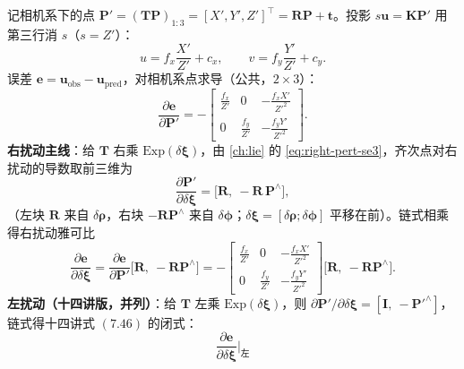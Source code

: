 \begin{derivation}
\label{thm:vo-reproj-jac}
记相机系下的点 $\mathbf{P}'=(\mathbf{T}\mathbf{P})_{1:3}=[X',Y',Z']^\top=\mathbf{R}\mathbf{P}+\mathbf{t}$\cite{gaoxiang2019slam14}。投影 $s\mathbf{u}=\mathbf{K}\mathbf{P}'$ 用第三行消 $s$（$s=Z'$）：
\begin{equation}
  u=f_x\frac{X'}{Z'}+c_x,\qquad v=f_y\frac{Y'}{Z'}+c_y.
  \label{eq:vo-proj-uv}
\end{equation}
误差 $\mathbf{e}=\mathbf{u}_{\text{obs}}-\mathbf{u}_{\text{pred}}$，对相机系点求导（公共，$2\times3$）：
\begin{equation}
  \frac{\partial\mathbf{e}}{\partial\mathbf{P}'}=-\begin{bmatrix}\frac{f_x}{Z'}&0&-\frac{f_xX'}{Z'^2}\\[2pt]0&\frac{f_y}{Z'}&-\frac{f_yY'}{Z'^2}\end{bmatrix}.
  \label{eq:vo-de-dP}
\end{equation}
\textbf{右扰动主线}：给 $\mathbf{T}$ 右乘 $\mathrm{Exp}(\delta\boldsymbol{\xi})$，由 \cref{ch:lie} 的 \cref{eq:right-pert-se3}，齐次点对右扰动的导数取前三维为
\begin{equation}
  \frac{\partial\mathbf{P}'}{\partial\delta\boldsymbol{\xi}}=\big[\mathbf{R},\ -\mathbf{R}\,\mathbf{P}^\wedge\big],
  \label{eq:vo-dP-dxi-right}
\end{equation}
（左块 $\mathbf{R}$ 来自 $\delta\boldsymbol{\rho}$，右块 $-\mathbf{R}\mathbf{P}^\wedge$ 来自 $\delta\boldsymbol{\phi}$；$\delta\boldsymbol{\xi}=[\delta\boldsymbol{\rho};\delta\boldsymbol{\phi}]$ 平移在前）。链式相乘得右扰动雅可比
\begin{equation}
  \frac{\partial\mathbf{e}}{\partial\delta\boldsymbol{\xi}}
  =\frac{\partial\mathbf{e}}{\partial\mathbf{P}'}\big[\mathbf{R},\ -\mathbf{R}\mathbf{P}^\wedge\big]
  =-\begin{bmatrix}\frac{f_x}{Z'}&0&-\frac{f_xX'}{Z'^2}\\0&\frac{f_y}{Z'}&-\frac{f_yY'}{Z'^2}\end{bmatrix}\big[\mathbf{R},\ -\mathbf{R}\mathbf{P}^\wedge\big].
  \label{eq:vo-jac-right}
\end{equation}
\textbf{左扰动（十四讲版，并列）}：给 $\mathbf{T}$ 左乘 $\mathrm{Exp}(\delta\boldsymbol{\xi})$，则 $\partial\mathbf{P}'/\partial\delta\boldsymbol{\xi}=[\mathbf{I},\ -\mathbf{P}'^\wedge]$，链式得十四讲式 $(7.46)$ 的闭式\cite{gaoxiang2019slam14}：
\begin{equation}
  \frac{\partial\mathbf{e}}{\partial\delta\boldsymbol{\xi}}\Big|_{\text{左}}

\end{equation}
\end{derivation}
